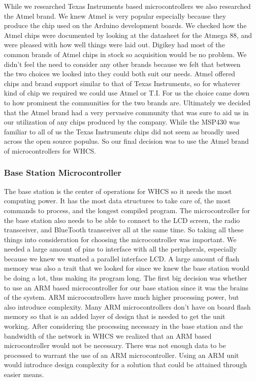 While we researched Texas Instruments based microcontrollers we also researched
the Atmel brand. We knew Atmel is very popular especially because they produce
the chip used on the Arduino development boards. We checked how the Atmel chips
were documented by looking at the datasheet for the Atmega 88, and were pleased
with how well things were laid out.  Digikey had most of the common brands of
Atmel chips in stock so acquisition would be no problem. We didn{}'t feel the
need to consider any other brands because we felt that between the two choices
we looked into they could both suit our needs. Atmel offered chips and brand
support similar to that of Texas Instruments, so for whatever kind of chip we
required we could use Atmel or T.I. For us the choice came down to how
prominent the communities for the two brands are. Ultimately we decided that
the Atmel brand had a very pervasive community that was sure to aid us in our
utilization of any chips produced by the company. While the MSP430 was familiar
to all of us the Texas Instruments chips did not seem as broadly used across
the open source populus. So our final decision was to use the Atmel brand of
microcontrollers for WHCS.

\subsubsection{Base Station Microcontroller}
The base station is the center of operations for WHCS so it needs the most
computing power. It has the most data structures to take care of, the most
commands to process, and the longest compiled program. The microcontroller for
the base station also needs to be able to connect to the LCD screen, the radio
transceiver, and BlueTooth transceiver all at the same time. So taking all
these things into consideration for choosing the microcontroller was important.
We needed a large amount of pins to interface with all the peripherals,
especially because we knew we wanted a parallel interface LCD. A large amount
of flash memory was also a trait that we looked for since we knew the base
station would be doing a lot, thus making its program long. The first big
decision was whether to use an ARM based microcontroller for our base station
since it was the brains of the system. ARM microcontrollers have much higher
processing power, but also introduce complexity. Many ARM microcontrollers
don{}'t have on board flash memory so that is an added layer of design that is
needed to get the unit working. After considering the processing necessary in
the base station and the bandwidth of the network in WHCS we realized that an
ARM based microcontroller would not be necessary. There was not enough data to
be processed to warrant the use of an ARM microcontroller. Using an ARM unit
would introduce design complexity for a solution that could be attained through
easier means.

